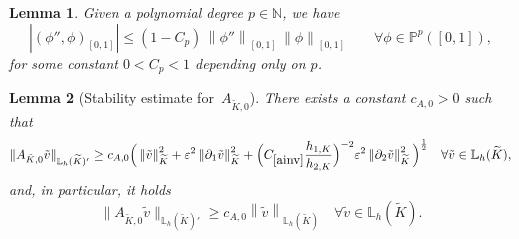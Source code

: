 \documentclass[10pt,a4paper]{amsart}
\newtheorem{lemma}{Lemma}
\newcommand{\AKO}{{A_{\tilde K,0}}}
\newcommand{\IL}{\mathbb{L}}
\newcommand{\IP}{\mathbb{P}}
\newcommand{\Kt}{\widetilde{K}}
\newcommand{\const}[1]{C_{\eqref{#1}}}
\newcommand{\eps}{\varepsilon}
\newcommand{\hKot}{h_{1,K}}
\newcommand{\hKtt}{h_{2,K}}
\newcommand*{\norm}[1]{\left\|#1\right\|}
\begin{document}
	\begin{lemma}\label{lem:noeigenpoly}
	Given a polynomial degree $p\in\mathbb{N}$, 
    we have 
	\begin{equation}\label{eq:noeigenpoly}
		|(\phi'', \phi)_{[0,1]} | \leq (1-C_p)\,\norm{\phi''}_{[0,1]} \,\norm{\phi}_{[0,1]} \qquad \forall \phi \in \IP^p([0, 1]), 
		\end{equation}
		for some constant $0<C_p<1$ depending only on $p$. 
		\end{lemma}

	\begin{lemma}[Stability estimate for~$A_{\Kt, 0}$]\label{lem:localcoercivity}
		There exists a constant $c_{A,0}>0$ such that
	\begin{equation*}
		\|\AKO  \tilde v \|_{\IL_h(\Kt)'} 
	    \geq c_{A,0}
	    \Big( \norm{\tilde v}_{\Kt}^2 + \eps^2 \norm{\partial_1 \tilde v}_{\Kt}^2 + \Big(\const{ainv}\frac{\hKot}{\hKtt}\Big)^{-2} \eps^2 \norm{\partial_2 \tilde v}_{\Kt}^2 \Big)^{\frac{1}{2}}
	    \quad \forall \tilde v\in \IL_h(\Kt),
	\end{equation*}
    and, in particular,
    it holds 
	\begin{equation*}
		\|\AKO  \tilde v \|_{\IL_h(\Kt)'} 
        \geq c_{A,0} \norm{\tilde v}_{\mathbb{L}_h(\Kt)}
	    \quad \forall \tilde v\in \IL_h(\Kt).
	\end{equation*}
	\end{lemma}
\end{document}
